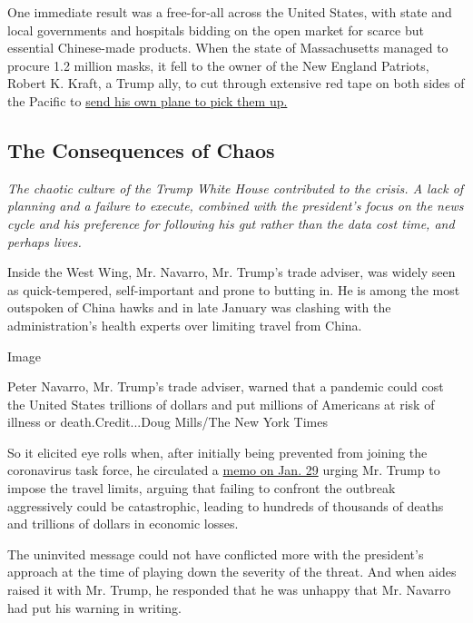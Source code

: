 One immediate result was a free-for-all across the United States, with
state and local governments and hospitals bidding on the open market for
scarce but essential Chinese-made products. When the state of
Massachusetts managed to procure 1.2 million masks, it fell to the owner
of the New England Patriots, Robert K. Kraft, a Trump ally, to cut
through extensive red tape on both sides of the Pacific to
\href{https://www.nytimes3xbfgragh.onion/aponline/2020/04/02/sports/football/ap-fbn-patriots-masks-assist.html}{send
his own plane to pick them up.}

\hypertarget{the-consequences-of-chaos}{%
\subsection{The Consequences of Chaos}\label{the-consequences-of-chaos}}

\emph{The chaotic culture of the Trump White House contributed to the
crisis. A lack of planning and a failure to execute, combined with the
president's focus on the news cycle and his preference for following his
gut rather than the data cost time, and perhaps lives.}

Inside the West Wing, Mr. Navarro, Mr. Trump's trade adviser, was widely
seen as quick-tempered, self-important and prone to butting in. He is
among the most outspoken of China hawks and in late January was clashing
with the administration's health experts over limiting travel from
China.

Image

Peter Navarro, Mr. Trump's trade adviser, warned that a pandemic could
cost the United States trillions of dollars and put millions of
Americans at risk of illness or death.Credit...Doug Mills/The New York
Times

So it elicited eye rolls when, after initially being prevented from
joining the coronavirus task force, he circulated a
\href{https://www.nytimes3xbfgragh.onion/2020/04/06/us/politics/navarro-warning-trump-coronavirus.html}{memo
on Jan. 29} urging Mr. Trump to impose the travel limits, arguing that
failing to confront the outbreak aggressively could be catastrophic,
leading to hundreds of thousands of deaths and trillions of dollars in
economic losses.

The uninvited message could not have conflicted more with the
president's approach at the time of playing down the severity of the
threat. And when aides raised it with Mr. Trump, he responded that he
was unhappy that Mr. Navarro had put his warning in writing.

